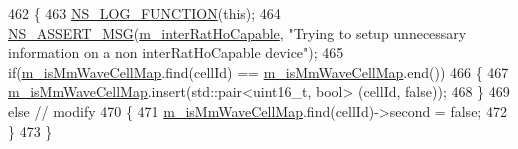 \begin{DoxyCode}
462 \{
463   \hyperlink{log-macros-disabled_8h_a90b90d5bad1f39cb1b64923ea94c0761}{NS\_LOG\_FUNCTION}(\textcolor{keyword}{this});
464   \hyperlink{assert_8h_aff5ece9066c74e681e74999856f08539}{NS\_ASSERT\_MSG}(\hyperlink{classns3_1_1LteUeRrc_a0702e1a453de2d8f1c454fea344ef4f0}{m\_interRatHoCapable}, \textcolor{stringliteral}{"Trying to setup unnecessary
       information on a non interRatHoCapable device"});
465   \textcolor{keywordflow}{if}(\hyperlink{classns3_1_1LteUeRrc_aeeda32d2655317078eb67377e81aea02}{m\_isMmWaveCellMap}.find(cellId) == \hyperlink{classns3_1_1LteUeRrc_aeeda32d2655317078eb67377e81aea02}{m\_isMmWaveCellMap}.end())
466   \{
467     \hyperlink{classns3_1_1LteUeRrc_aeeda32d2655317078eb67377e81aea02}{m\_isMmWaveCellMap}.insert(std::pair<uint16\_t, bool> (cellId, \textcolor{keyword}{false}));
468   \}
469   \textcolor{keywordflow}{else} \textcolor{comment}{// modify}
470   \{
471     \hyperlink{classns3_1_1LteUeRrc_aeeda32d2655317078eb67377e81aea02}{m\_isMmWaveCellMap}.find(cellId)->second = \textcolor{keyword}{false};
472   \}
473 \}
\end{DoxyCode}
